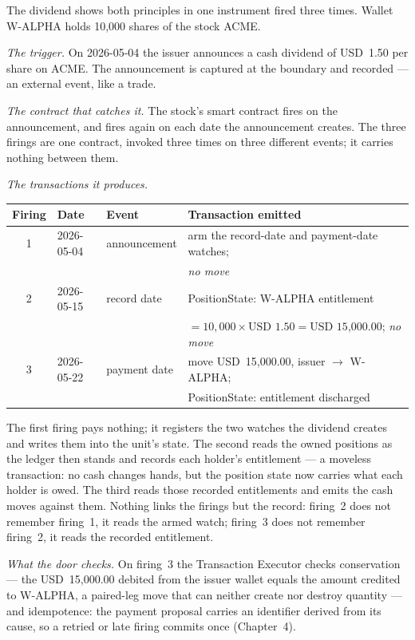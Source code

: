 \documentclass[11pt,a4paper]{article}
\newcommand{\USD}[1]{\mbox{USD~#1}}
\begin{document}
The dividend shows both principles in one instrument fired three times. Wallet
W-ALPHA holds 10{,}000 shares of the stock ACME.

\emph{The trigger.} On 2026-05-04 the issuer announces a cash dividend of
\USD{1.50} per share on ACME. The announcement is captured at the boundary and
recorded --- an external event, like a trade.

\emph{The contract that catches it.} The stock's smart contract fires on the
announcement, and fires again on each date the announcement creates. The three
firings are one contract, invoked three times on three different events; it
carries nothing between them.

\emph{The transactions it produces.}

\begin{center}
\begin{tabular}{clll}
\toprule
Firing & Date & Event & Transaction emitted \\
\midrule
1 & 2026-05-04 & announcement & arm the record-date and payment-date watches; \\
  &            &              & \emph{no move} \\
2 & 2026-05-15 & record date  & PositionState: W-ALPHA entitlement \\
  &            &              & $= 10{,}000 \times \USD{1.50} = \USD{15{,}000.00}$; \emph{no move} \\
3 & 2026-05-22 & payment date & move \USD{15{,}000.00}, issuer $\rightarrow$ W-ALPHA; \\
  &            &              & PositionState: entitlement discharged \\
\bottomrule
\end{tabular}
\end{center}

The first firing pays nothing; it registers the two watches the dividend
creates and writes them into the unit's state. The second reads the owned
positions as the ledger then stands and records each holder's entitlement --- a
moveless transaction: no cash changes hands, but the position state now carries
what each holder is owed. The third reads those recorded entitlements and emits
the cash moves against them. Nothing links the firings but the record: firing~2
does not remember firing~1, it reads the armed watch; firing~3 does not remember
firing~2, it reads the recorded entitlement.

\emph{What the door checks.} On firing~3 the Transaction Executor checks
conservation --- the \USD{15{,}000.00} debited from the issuer wallet equals the
amount credited to W-ALPHA, a paired-leg move that can neither create nor
destroy quantity --- and idempotence: the payment proposal carries an identifier
derived from its cause, so a retried or late firing commits once (Chapter~4).
\end{document}
